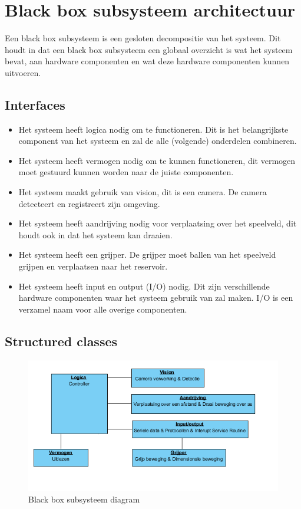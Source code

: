 \documentclass[12pt]{article} %
\begin{document}
\newpage
\section{Black box subsysteem architectuur}
\label{sec:Black box subsysteem architectuur}
Een black box subsysteem is een gesloten decompositie van het systeem. Dit houdt in dat een black box subsysteem een globaal overzicht is wat het systeem bevat, aan hardware componenten en wat deze hardware componenten kunnen uitvoeren.

\subsection{Interfaces}
\begin{itemize}
\item Het systeem heeft logica nodig om te functioneren. Dit is het belangrijkste component van het systeem en zal de alle (volgende) onderdelen combineren.
\item Het systeem heeft vermogen nodig om te kunnen functioneren, dit vermogen moet gestuurd kunnen worden naar de juiste componenten.
\item Het systeem maakt gebruik van vision, dit is een camera. De camera detecteert en registreert zijn omgeving.
\item Het systeem heeft aandrijving nodig voor verplaatsing over het speelveld, dit houdt ook in dat het systeem kan draaien.
\item Het systeem heeft een grijper. De grijper moet ballen van het speelveld grijpen en verplaatsen naar het reservoir.
\item Het systeem heeft input en output (I/O) nodig. Dit zijn verschillende hardware componenten waar het systeem gebruik van zal maken. I/O is een verzamel naam voor alle overige componenten. 
\end{itemize}
\clearpage

\subsection{Structured classes}
\begin{center}
\begin{figure}[h]
\includegraphics[scale=1.]{BlackBoxDiagram.png}
\caption{Black box subsysteem diagram}
\label{fig:deployment}
\end{figure}
\end{center}
\clearpage
\end{document}
